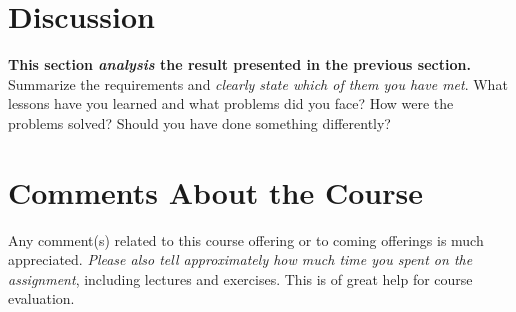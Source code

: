 \documentclass[a4paper]{scrartcl}
\begin{document}
\section{Discussion}

\textbf{This section \textit{analysis} the result presented in the previous section.} \\

\noindent Summarize the requirements and \textit{clearly state which of them you have met}. What lessons have you learned and what problems did you face? How were the problems solved? Should you have done something differently?

\section{Comments About the Course}

Any comment(s) related to this course offering or to coming offerings is much appreciated. \textit{Please also tell approximately how much time you spent on the assignment}, including lectures and exercises. This is of great help for course evaluation.

\printbibliography
\end{document}
